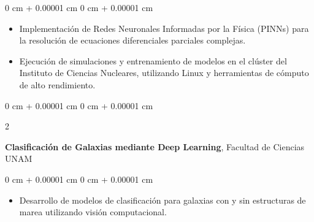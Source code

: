 \documentclass[10pt, letterpaper]{article}
\newenvironment{highlights}{
    \begin{itemize}[
        topsep=0.10 cm,
        parsep=0.10 cm,
        partopsep=0pt,
        itemsep=0pt,
        leftmargin=0 cm + 10pt
    ]
}{
    \end{itemize}
} %
\newenvironment{onecolentry}{
    \begin{adjustwidth}{
        0 cm + 0.00001 cm
    }{
        0 cm + 0.00001 cm
    }
}{
    \end{adjustwidth}
} %
\newenvironment{twocolentry}[2][]{
    \onecolentry
    \def\secondColumn{#2}
    \setcolumnwidth{\fill, 4.5 cm}
    \begin{paracol}{2}
}{
    \switchcolumn \raggedleft \secondColumn
    \end{paracol}
    \endonecolentry
} %
\begin{document}
        \vspace{0.10 cm}
        \begin{onecolentry}
            \begin{highlights}
                \item Implementación de Redes Neuronales Informadas por la Física (PINNs) para la resolución de ecuaciones diferenciales parciales complejas.
                \item Ejecución de simulaciones y entrenamiento de modelos en el clúster del Instituto de Ciencias Nucleares, utilizando Linux y herramientas de cómputo de alto rendimiento.
            \end{highlights}
        \end{onecolentry}

        \vspace{0.2 cm}

        \begin{twocolentry}{
            2025
        }
            \textbf{Clasificación de Galaxias mediante Deep Learning}, Facultad de Ciencias UNAM\end{twocolentry}

        \vspace{0.10 cm}
        \begin{onecolentry}
            \begin{highlights}
                \item Desarrollo de modelos de clasificación para galaxias con y sin estructuras de marea utilizando visión computacional.
            \end{highlights}
        \end{onecolentry}

        \vspace{0.2 cm}
\end{document}

